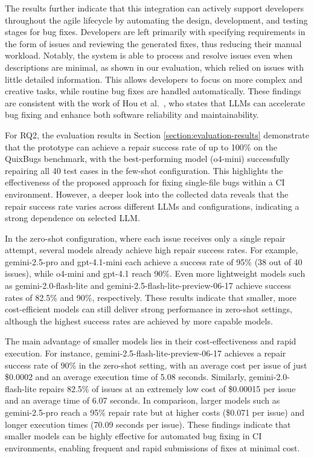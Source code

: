 The results further indicate that this integration can actively support developers throughout the agile lifecycle by automating the design, development, and testing stages for bug fixes. Developers are left primarily with specifying requirements in the form of issues and reviewing the generated fixes, thus reducing their manual workload. Notably, the system is able to process and resolve issues even when descriptions are minimal, as shown in our evaluation, which relied on issues with little detailed information. This allows developers to focus on more complex and creative tasks, while routine bug fixes are handled automatically. These findings are consistent with the work of Hou et al.~\cite{houLargeLanguageModels2024}, who states that \acp{LLM} can accelerate bug fixing and enhance both software reliability and maintainability.

For RQ2, the evaluation results in Section \ref{section:evaluation-results} demonstrate that the prototype can achieve a repair success rate of up to 100\% on the QuixBugs benchmark, with the best-performing model (o4-mini) successfully repairing all 40 test cases in the few-shot configuration. This highlights the effectiveness of the proposed approach for fixing single-file bugs within a CI environment. However, a deeper look into the collected data reveals that the repair success rate varies across different \acp{LLM} and configurations, indicating a strong dependence on selected \ac{LLM}.

In the zero-shot configuration, where each issue receives only a single repair attempt, several models already achieve high repair success rates. For example, gemini-2.5-pro and gpt-4.1-mini each achieve a success rate of 95\% (38 out of 40 issues), while o4-mini and gpt-4.1 reach 90\%. Even more lightweight models such as gemini-2.0-flash-lite and gemini-2.5-flash-lite-preview-06-17 achieve success rates of 82.5\% and 90\%, respectively. These results indicate that smaller, more cost-efficient models can still deliver strong performance in zero-shot settings, although the highest success rates are achieved by more capable models.

The main advantage of smaller models lies in their cost-effectiveness and rapid execution. For instance, gemini-2.5-flash-lite-preview-06-17 achieves a repair success rate of 90\% in the zero-shot setting, with an average cost per issue of just \$0.0002 and an average execution time of 5.08 seconds. Similarly, gemini-2.0-flash-lite repairs 82.5\% of issues at an extremely low cost of \$0.00015 per issue and an average time of 6.07 seconds. In comparison, larger models such as gemini-2.5-pro reach a 95\% repair rate but at higher costs (\$0.071 per issue) and longer execution times (70.09 seconds per issue). These findings indicate that smaller models can be highly effective for automated bug fixing in CI environments, enabling frequent and rapid submissions of fixes at minimal cost.

